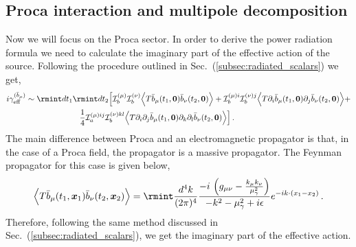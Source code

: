 \subsection{Proca interaction and multipole decomposition}
Now we will focus on the Proca sector. In order to derive the power radiation formula we need to calculate the imaginary part of the effective action of the source. Following the procedure outlined in Sec.~(\ref{subsec:radiated_scalars}) we get, 
\begin{align}
    \begin{split}
        i \gamma_\mathrm{eff}^{(\bar b_\mu)}&\sim \rmint dt_1\rmint d t_2 \Big[\mathcal{I}^{(\mu)}_{b}\mathcal{I}^{(\nu)}_{b}\Big\langle T \Bar{b}_{\mu}(t_1,\boldsymbol{0})\Bar{b}_{\nu}(t_2,\boldsymbol{0})\Big\rangle+\mathcal{I}^{(\mu)i}_{b}\mathcal{I}^{(\nu)j}_{b}\Big\langle T \partial_i \Bar{b}_{\mu}(t_1,\boldsymbol{0})\partial_j \Bar{b}_{\nu}(t_2,\boldsymbol{0})\Big\rangle+\\ &
        \,\,\,\,\,\,\,\,\,\,\,\,\,\,\,\,\,\,\,\,\,\,\,\,\,\,\,\,\,\,\,\,\,\,\,\,\,\,\,\,\frac{1}{4}\mathcal{I}^{(\mu)ij}_{a}\mathcal{I}^{(\nu)kl}_{b}\Big\langle T \partial_i\partial_j\Bar{b}_{\mu}(t_1,\boldsymbol{0})\partial_k\partial_l\Bar{b}_{\nu}(t_2,\boldsymbol{0})\Big\rangle\Big]\,.\label{5.1}
    \end{split}
\end{align}
The main difference between Proca and an electromagnetic propagator is that, in the case of a Proca field, the propagator is a massive propagator. The Feynman propagator for this case is given below,
\begin{align}
    \begin{split}
        \Big\langle T \Bar{b}_{\mu}(t_1,\boldsymbol{x}_1)\Bar{b}_{\nu}(t_2,\boldsymbol{x}_2)\Big\rangle=\rmint \frac{d^4k}{(2\pi)^4}\frac{-i\,\left(g_{\mu\nu}-\frac{k_\mu k_\nu}{\mu_\gamma ^2}\right)}{-k^2-\mu_{\gamma}^2+i\epsilon}e^{-ik\cdot(x_1-x_2)}\,.\label{5.2}
    \end{split}
\end{align}
Therefore, following the same method discussed in Sec.~(\ref{subsec:radiated_scalars}), we get the imaginary part of the effective action.
